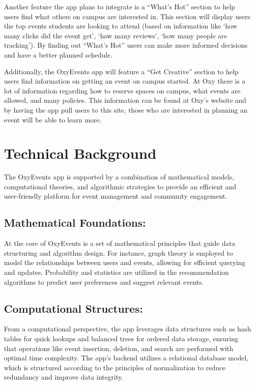 \documentclass[10pt,twocolumn]{article}
\begin{document}
Another feature the app plans to integrate is a “What’s Hot” section to help users find what others on campus are interested in. This section will display users the top events students are looking to attend (based on information like ‘how many clicks did the event get’, ‘how many reviews’, ‘how many people are tracking’). By finding out “What’s Hot” users can make more informed decisions and have a better planned schedule. 

Additionally, the OxyEvents app will feature a “Get Creative” section to help users find information on getting an event on campus started. At Oxy there is a lot of information regarding how to reserve spaces on campus, what events are allowed, and many policies. This information can be found at Oxy’s website and by having the app pull users to this site, those who are interested in planning an event will be able to learn more. 

\section{Technical Background}
The OxyEvents app is supported by a combination of mathematical models, computational theories, and algorithmic strategies to provide an efficient and user-friendly platform for event management and community engagement.

\subsection{Mathematical Foundations:} At the core of OxyEvents is a set of mathematical principles that guide data structuring and algorithm design. For instance, graph theory is employed to model the relationships between users and events, allowing for efficient querying and updates. Probability and statistics are utilized in the recommendation algorithms to predict user preferences and suggest relevant events.
\subsection{Computational Structures:} From a computational perspective, the app leverages data structures such as hash tables for quick lookups and balanced trees for ordered data storage, ensuring that operations like event insertion, deletion, and search are performed with optimal time complexity. The app’s backend utilizes a relational database model, which is structured according to the principles of normalization to reduce redundancy and improve data integrity.
\end{document}
